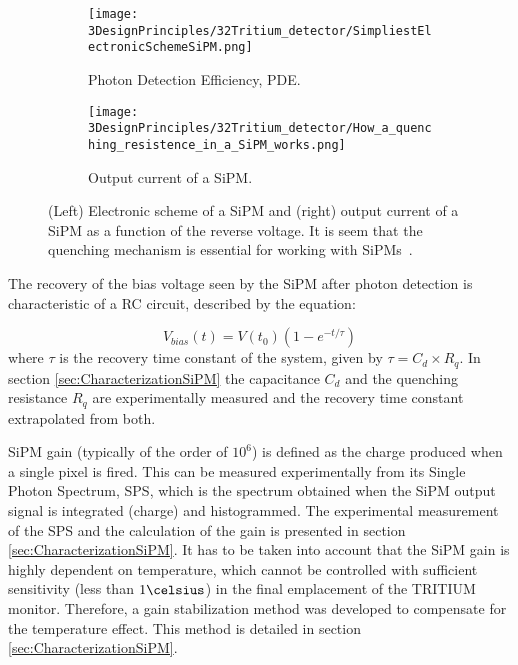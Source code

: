 \begin{figure}
\centering
    \begin{subfigure}[b]{0.45\textwidth}
    \centering
    \texttt{[image: 3DesignPrinciples/32Tritium\_detector/SimpliestElectronicSchemeSiPM.png]}  
    \caption{Photon Detection Efficiency, PDE.\label{subfig:ElectricModelSiPM}}
    \end{subfigure}
    \hfill
    \begin{subfigure}[b]{0.45\textwidth}
    \centering
    \texttt{[image: 3DesignPrinciples/32Tritium\_detector/How\_a\_quenching\_resistence\_in\_a\_SiPM\_works.png]}  
    \caption{Output current of a SiPM.\label{subfig:HowSiPMworks}}
    \end{subfigure}
 \caption{(Left) Electronic scheme of a SiPM and (right) output current of a SiPM as a function of the reverse voltage. It is seem that the quenching mechanism is essential for working with SiPMs~\cite{DataSheetSensL}.}
 \label{fig:ChenchingResistance}
\end{figure}

The recovery of the bias voltage seen by the SiPM after photon detection is characteristic of a RC circuit, described by the equation: 

\begin{equation}
V_{bias}(t)=V(t_0)\left(1-e^{-t/\tau} \right)
\label{RCCircuitBiasVoltage}
\end{equation}
where $\tau$ is the recovery time constant of the system, given by $\tau=C_d \times R_q$. In section \ref{sec:CharacterizationSiPM} the capacitance $C_d$ and the quenching resistance $R_q$ are experimentally measured and the recovery time constant extrapolated from both.

SiPM gain (typically of the order of $10^6$) is defined as the charge produced when a single pixel is fired. This can be measured experimentally from its Single Photon Spectrum, SPS, which is the spectrum obtained when the SiPM output signal is integrated (charge) and histogrammed. The experimental measurement of the SPS and the calculation of the gain is presented in section \ref{sec:CharacterizationSiPM}. It has to be taken into account that the SiPM gain is highly dependent on temperature, which cannot be controlled with sufficient sensitivity (less than $1\celsius$) in the final emplacement of the TRITIUM monitor. Therefore, a gain stabilization method was developed to compensate for the temperature effect. This method is detailed in section \ref{sec:CharacterizationSiPM}.

